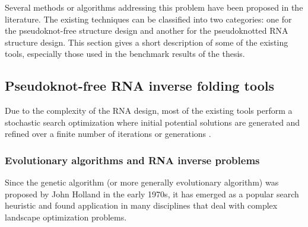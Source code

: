 Several methods or algorithms addressing this problem have been proposed in the literature. The existing techniques can be classified into two categories: one for the pseudoknot-free structure design and another for the pseudoknotted RNA structure design. This section gives a short description of some of the existing tools, especially those used in the benchmark results of the thesis.

\subsection{Pseudoknot-free RNA inverse folding tools}
Due to the complexity of the RNA design,  most of the existing tools perform a stochastic search optimization where initial potential solutions are generated and refined over a finite number of iterations or generations \cite{esmaili2015erd,dromi2008reconstruction,esmaili2014evolutionary,taneda2011modena,nemo2018}.
\subsubsection{Evolutionary algorithms and RNA inverse problems}
Since the genetic algorithm (or more generally evolutionary algorithm) was proposed by John Holland \cite{holland1992adaptation} in the early 1970s, it has emerged as a popular search heuristic and found application in many disciplines that deal with complex landscape optimization problems. 

